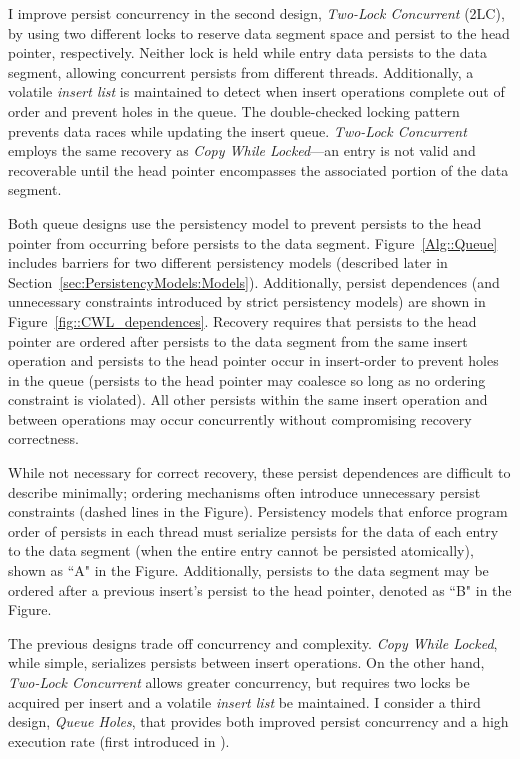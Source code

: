 I improve persist concurrency in the second design, \emph{Two-Lock Concurrent} (2LC), by using two different locks to reserve data segment space and persist to the head pointer, respectively.
Neither lock is held while entry data persists to the data segment, allowing concurrent persists from different threads.
Additionally, a volatile \emph{insert list} is maintained to detect when insert operations complete out of order and prevent holes in the queue.
The double-checked locking pattern prevents data races while updating the insert queue.
\emph{Two-Lock Concurrent} employs the same recovery as \emph{Copy While Locked}---an entry is not valid and recoverable until the head pointer encompasses the associated portion of the data segment.



Both queue designs use the persistency model to prevent persists to the head pointer from occurring before persists to the data segment.
Figure~\ref{Alg::Queue} includes barriers for two different persistency models (described later in Section~\ref{sec:PersistencyModels:Models}).
Additionally, persist dependences (and unnecessary constraints introduced by strict persistency models) are shown in Figure~\ref{fig::CWL_dependences}.
Recovery requires that persists to the head pointer are ordered after persists to the data segment from the same insert operation and persists to the head pointer occur in insert-order to prevent holes in the queue (persists to the head pointer may coalesce so long as no ordering constraint is violated).
All other persists within the same insert operation and between operations may occur concurrently without compromising recovery correctness.

While not necessary for correct recovery, these persist dependences are difficult to describe minimally; ordering mechanisms often introduce unnecessary persist constraints (dashed lines in the Figure).
Persistency models that enforce program order of persists in each thread must serialize persists for the data of each entry to the data segment (when the entire entry cannot be persisted atomically), shown as ``A" in the Figure.
Additionally, persists to the data segment may be ordered after a previous insert's persist to the head pointer, denoted as ``B" in the Figure.

The previous designs trade off concurrency and complexity.
\emph{Copy While Locked}, while simple, serializes persists between insert operations.
On the other hand, \emph{Two-Lock Concurrent} allows greater concurrency, but requires two locks be acquired per insert and a volatile \emph{insert list} be maintained.
I consider a third design, \emph{Queue Holes}, that provides both improved persist concurrency and a high execution rate (first introduced in \cite{FangHsiao11}).

